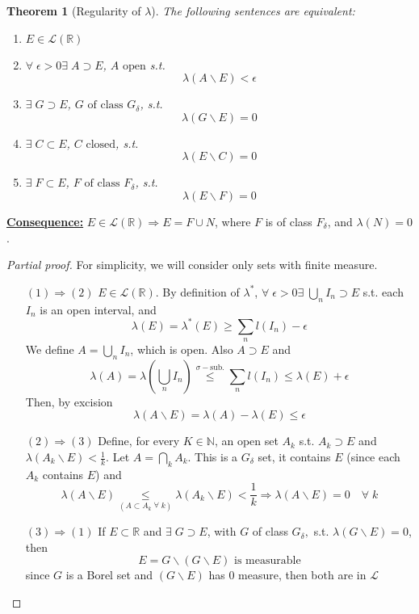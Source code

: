 \documentclass[a4paper,12pt]{article}
\theoremstyle{break}
\newtheorem{theorem}{Theorem}[section]
\newcommand{\real}{\mathbb{R}}
\numberwithin{equation}{section}
\begin{document}
\begin{theorem}[Regularity of \(\lambda\)]
    The following sentences are equivalent:
    \begin{enumerate}
        \item \(E \in \mathcal{L}(\real)\)
        \item \(\forall \; \epsilon > 0 \exists \; A \supset E\), \(A \mbox{ open}\) s.t.
        \[
            \lambda \left(A \backslash E\right) < \epsilon
        \]
        \item \(\exists \; G \supset E\), \(G \mbox{ of class } G_{\delta}\), s.t. 
        \[
            \lambda(G\backslash E) = 0
        \]
        \item \(\exists \; C \subset E\), \(C \mbox{ closed}\), s.t. 
        \[
            \lambda(E\backslash C) = 0
        \]
        \item \(\exists \; F \subset E\), \(F \mbox{ of class } F_{\delta}\), s.t. 
        \[
            \lambda(E\backslash F) = 0
        \]
    \end{enumerate}
\end{theorem}
\underline{\textbf{Consequence:}} \(E \in \mathcal{L}(\real) \Longrightarrow E = F \cup N\), where \(F\) is of class \(F_{\delta}\), and \(\lambda(N) = 0\).
\begin{proof}[Partial proof]
    For simplicity, we will consider only sets with finite measure.
    \begin{itemize}
        \item[\((1) \Rightarrow (2)\)] \(E \in \mathcal{L}(\real)\). By definition of \(\lambda^*\), \(\forall \; \epsilon > 0 \exists \; \bigcup_n I_n \supset E\) s.t. each \(I_n\) is an open interval, and 
        \[
            \lambda(E) = \lambda^*(E) \geq \sum_n l(I_n) -\epsilon
        \]
        We define \(A = \bigcup_n I_n\), which is open. Also \(A \supset E\) and 
        \[
            \lambda(A)= \lambda\left(\bigcup_n I_n\right) \overset{\sigma-\mbox{sub.}}{\leq} \sum_n l(I_n) \leq \lambda(E) + \epsilon
        \]
        Then, by excision
        \[
            \lambda(A \backslash E) = \lambda(A) - \lambda(E) \leq \epsilon
        \]
        \item[\((2) \Rightarrow (3)\)] Define, for every \(K \in \mathbb{N}\), an open set \(A_k\) s.t. \(A_k \supset E\) and \(\lambda(A_k \backslash E) < \frac{1}{k}\). Let \(A = \bigcap_k A_k\). This is a \(G_{\delta}\) set, it contains \(E\) (since each \(A_k\) contains \(E\)) and 
        \[
            \lambda(A \backslash E) \underset{(A \subset A_k \; \forall \; k)}{\leq} \lambda(A_k \backslash E) < \frac{1}{k} \Longrightarrow \lambda(A \backslash E) = 0 \quad \forall \; k
        \]
        \item[\((3) \Rightarrow (1)\)] If \(E \subset \real\) and \(\exists\; G \supset E\), with \(G\) of class \(G_{\delta},\) s.t. \(\lambda(G \backslash E) = 0\), then
        \[
            E = G \backslash(G \backslash E) \mbox{ is measurable}
        \]
        since \(G\) is a Borel set and \((G \backslash E)\) has \(0\) measure, then both are in \(\mathcal{L}\)
    \end{itemize}
\end{proof}
\end{document}
